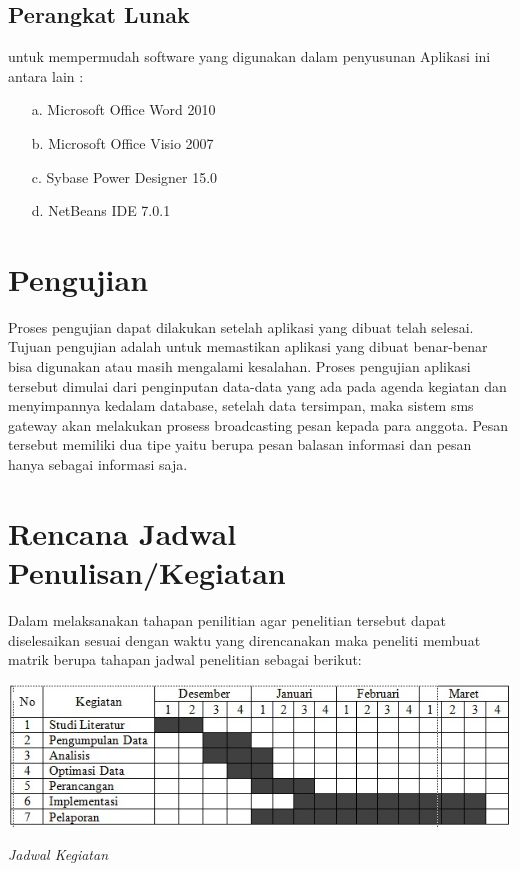 \documentclass{jtetiproposalskripsi}
\begin{document}
\subsection{Perangkat Lunak}
untuk mempermudah software yang digunakan dalam penyusunan Aplikasi ini antara lain :
\begin{itemize}

\item[a.]	Microsoft Office Word 2010
\item[b.]	Microsoft Office Visio 2007
\item[c.]	Sybase Power Designer 15.0
\item[d.]	NetBeans IDE 7.0.1
\end{itemize}


\section{Pengujian}
Proses pengujian dapat dilakukan setelah aplikasi yang dibuat telah selesai. Tujuan pengujian adalah untuk memastikan aplikasi yang dibuat benar-benar bisa digunakan atau masih mengalami kesalahan. Proses pengujian aplikasi tersebut dimulai dari penginputan data-data yang ada pada agenda kegiatan dan menyimpannya kedalam database, setelah data tersimpan, maka sistem sms gateway akan melakukan prosess broadcasting pesan kepada para anggota. Pesan tersebut memiliki dua tipe yaitu berupa pesan balasan informasi dan pesan hanya sebagai informasi saja.

\section{Rencana Jadwal Penulisan/Kegiatan}
Dalam melaksanakan tahapan penilitian agar penelitian tersebut dapat diselesaikan sesuai dengan waktu yang direncanakan maka peneliti membuat matrik berupa tahapan jadwal penelitian sebagai berikut:
\begin{table}[ht!]
\centering
\includegraphics[width=1\textwidth]{gambar/Jadwal-Ayu}
\caption{\textit{\textit{Jadwal Kegiatan}}}
\label{wsn}
\end{table}
\newpage
\end{document}
